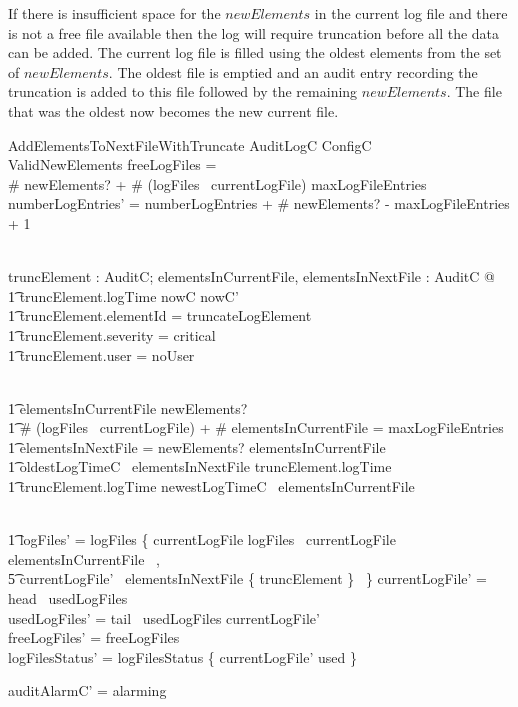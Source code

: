 If there is insufficient space for the $newElements$ in the
current log file and there is not a free file available then the log
will require truncation before all the data can be added.  The
current log file is filled using the oldest elements from the set of
$newElements$. The oldest file is emptied and an audit entry recording
the truncation is added to this file followed by the 
 remaining $newElements$. The file that was the oldest now becomes the new current file.


\begin{schema}{AddElementsToNextFileWithTruncate}
        \Delta AuditLogC
\also
        ConfigC
\\      ValidNewElements
\where
        freeLogFiles = \emptyset
\\      \# newElements? + \# (logFiles~ currentLogFile) \geq maxLogFileEntries  
\also
        numberLogEntries' = numberLogEntries + \# newElements? -
         maxLogFileEntries + 1

\\      \exists truncElement : AuditC; elementsInCurrentFile, elementsInNextFile :
   \finset AuditC  @ 
\\ \t1        truncElement.logTime \in nowC \upto nowC'
\\  \t1  \land truncElement.elementId = truncateLogElement
\\ \t1   \land truncElement.severity = critical  
\\ \t1   \land truncElement.user = noUser   
                  
\also
\\ \t1  \land elementsInCurrentFile \subseteq newElements? 
\\ \t1  \land 
        \# (logFiles~ currentLogFile) + \# elementsInCurrentFile =
        maxLogFileEntries
\\ \t1  \land elementsInNextFile = newElements? \setminus
        elementsInCurrentFile
\\ \t1  \land oldestLogTimeC~ elementsInNextFile \geq truncElement.logTime
\\ \t1  \land truncElement.logTime \geq newestLogTimeC~ elementsInCurrentFile        

\also
\\ \t1  \land logFiles' = logFiles \oplus \{ currentLogFile \mapsto
            logFiles~ currentLogFile \cup elementsInCurrentFile~ ,
\\ \t5      currentLogFile'~ \mapsto elementsInNextFile \cup 
        \{ truncElement \}~ \} 
\also
        currentLogFile' = head~ usedLogFiles
\\      usedLogFiles' = tail~ usedLogFiles \cat \langle currentLogFile' \rangle
\\      freeLogFiles' = freeLogFiles
\\      logFilesStatus' = logFilesStatus \oplus \{ currentLogFile'
\mapsto used \}

\also
        auditAlarmC' = alarming
\end{schema}

